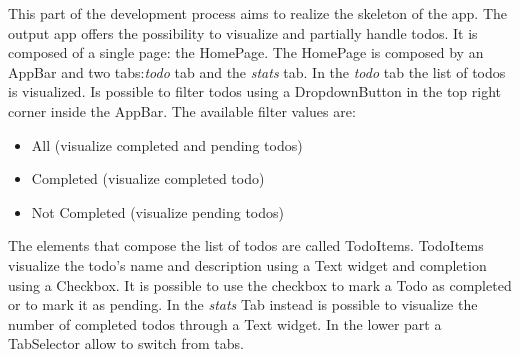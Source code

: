 
This part of the development process aims to realize the skeleton of the app. The output app  offers the possibility to visualize and partially handle todos. It is composed of a single page: the HomePage. The HomePage is composed by an AppBar and two tabs:\textit{todo} tab and the \textit{stats} tab. 
In the \textit{todo}  tab the list of todos is visualized. Is possible to filter todos using a DropdownButton in the top right corner inside the AppBar. 
The available filter values are:
\begin{itemize}
    \item All (visualize completed and pending todos)
    \item Completed (visualize completed todo)
    \item Not Completed (visualize pending todos)
\end{itemize}
The elements that compose the list of todos are called TodoItems. TodoItems visualize the todo’s name and description using a Text widget and completion using a Checkbox. It is possible to use the checkbox to mark a Todo as completed or to mark it as pending. 
In the \textit{stats} Tab instead is possible to visualize the number of completed todos through a Text widget.
In the lower part a TabSelector allow to switch from tabs.